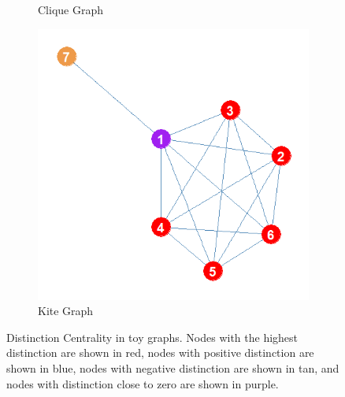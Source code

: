 \documentclass[12pt]{article}
\begin{document}
\begin{figure}
\begin{subfigure}[b]{0.3\textwidth}
            \caption{Clique Graph}
            \label{fig:clique}
    \end{subfigure}
    \begin{subfigure}[b]{0.3\textwidth}
        \includegraphics[width=1.0\textwidth]{Plots/Toys/kite.png}
            \caption{Kite Graph}
            \label{fig:kite}
    \end{subfigure}
    \caption{Distinction Centrality in toy graphs. Nodes with the highest distinction are shown in red, nodes with positive distinction are shown in blue, nodes with negative distinction are shown in tan, and nodes with distinction close to zero are shown in purple.}
    \label{fig:toys}
\end{figure}














\end{document}
